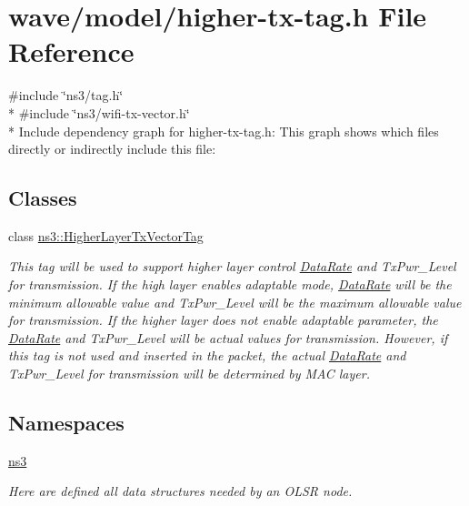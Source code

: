 \hypertarget{higher-tx-tag_8h}{}\section{wave/model/higher-\/tx-\/tag.h File Reference}
\label{higher-tx-tag_8h}
{\ttfamily \#include \char`\"{}ns3/tag.\+h\char`\"{}}\\*
{\ttfamily \#include \char`\"{}ns3/wifi-\/tx-\/vector.\+h\char`\"{}}\\*
Include dependency graph for higher-\/tx-\/tag.h\+:
This graph shows which files directly or indirectly include this file\+:
\subsection*{Classes}
\begin{DoxyCompactItemize}
\item 
class \hyperlink{classns3_1_1HigherLayerTxVectorTag}{ns3\+::\+Higher\+Layer\+Tx\+Vector\+Tag}
\begin{DoxyCompactList}\small\item\em This tag will be used to support higher layer control \hyperlink{classns3_1_1DataRate}{Data\+Rate} and Tx\+Pwr\+\_\+\+Level for transmission. If the high layer enables adaptable mode, \hyperlink{classns3_1_1DataRate}{Data\+Rate} will be the minimum allowable value and Tx\+Pwr\+\_\+\+Level will be the maximum allowable value for transmission. If the higher layer does not enable adaptable parameter, the \hyperlink{classns3_1_1DataRate}{Data\+Rate} and Tx\+Pwr\+\_\+\+Level will be actual values for transmission. However, if this tag is not used and inserted in the packet, the actual \hyperlink{classns3_1_1DataRate}{Data\+Rate} and Tx\+Pwr\+\_\+\+Level for transmission will be determined by M\+AC layer. \end{DoxyCompactList}\end{DoxyCompactItemize}
\subsection*{Namespaces}
\begin{DoxyCompactItemize}
\item 
 \hyperlink{namespacens3}{ns3}
\begin{DoxyCompactList}\small\item\em Here are defined all data structures needed by an O\+L\+SR node. \end{DoxyCompactList}\end{DoxyCompactItemize}
